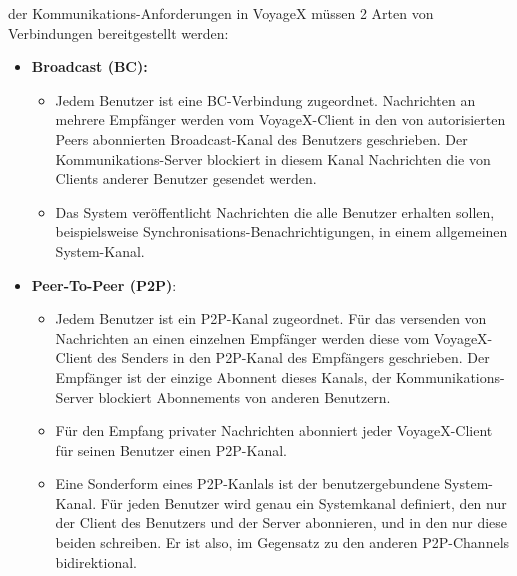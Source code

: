 der Kommunikations-Anforderungen in VoyageX müssen 2 Arten von Verbindungen bereitgestellt werden:
\begin{itemize}[leftmargin=*,noitemsep,topsep=1ex,parsep=0pt,partopsep=0pt]
\item \textbf{Broadcast (BC):}
	\begin{itemize}
		\item Jedem Benutzer ist eine BC-Verbindung zugeordnet. Nachrichten an mehrere Empfänger werden vom VoyageX-Client in den von autorisierten Peers abonnierten Broadcast-Kanal des Benutzers geschrieben. Der Kommunikations-Server blockiert in diesem Kanal Nachrichten die von Clients anderer Benutzer gesendet werden.
		\item Das System veröffentlicht Nachrichten die alle Benutzer erhalten sollen, beispielsweise Synchronisations-Benachrichtigungen, in einem allgemeinen System-Kanal.
	\end{itemize}

\item \textbf{Peer-To-Peer (P2P)}: 
	\begin{itemize}
		\item Jedem Benutzer ist ein P2P-Kanal zugeordnet. Für das versenden von Nachrichten an einen einzelnen Empfänger werden diese vom VoyageX-Client des Senders in den P2P-Kanal des Empfängers geschrieben. Der Empfänger ist der einzige Abonnent dieses Kanals, der Kommunikations-Server blockiert Abonnements von anderen Benutzern.
		\item Für den Empfang privater Nachrichten abonniert jeder VoyageX-Client für seinen Benutzer einen P2P-Kanal.
		\item Eine Sonderform eines P2P-Kanlals ist der benutzergebundene System-Kanal. Für jeden Benutzer wird genau ein
Systemkanal definiert, den nur der Client des Benutzers und der Server abonnieren, und in den nur diese beiden schreiben. Er ist also, im Gegensatz zu den anderen P2P-Channels bidirektional.
	\end{itemize}
\end{itemize}
